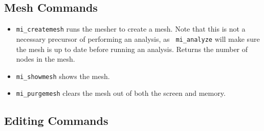 \subsection{Mesh Commands}

\begin{itemize}
\item{\tt mi\_createmesh} runs the mesher to create a mesh. Note that this is not a
necessary precursor of performing an analysis, as {\tt
mi\_analyze} will make sure the mesh is up to date before running
an analysis. Returns the number of nodes in the mesh.

\item{\tt mi\_showmesh} shows the mesh.

\item{\tt mi\_purgemesh} clears the mesh out of both the screen and
memory.
\end{itemize}

\subsection{Editing Commands}

